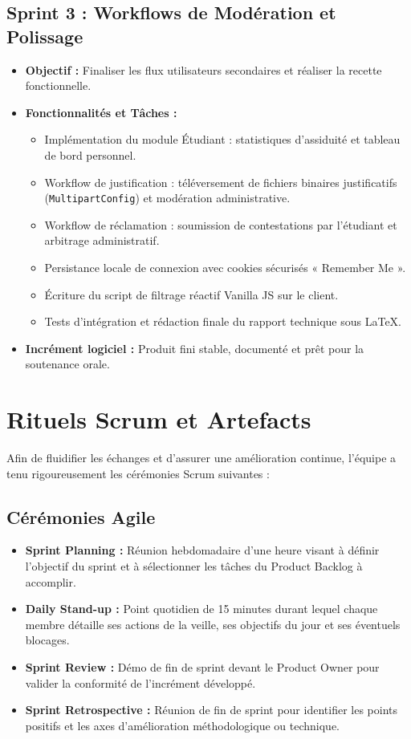 \documentclass[12pt,a4paper]{article}
\begin{document}
\subsection{Sprint 3 : Workflows de Modération et Polissage}
\begin{itemize}
    \item \textbf{Objectif :} Finaliser les flux utilisateurs secondaires et réaliser la recette fonctionnelle.
    \item \textbf{Fonctionnalités et Tâches :}
    \begin{itemize}
        \item Implémentation du module Étudiant : statistiques d'assiduité et tableau de bord personnel.
        \item Workflow de justification : téléversement de fichiers binaires justificatifs (\texttt{MultipartConfig}) et modération administrative.
        \item Workflow de réclamation : soumission de contestations par l'étudiant et arbitrage administratif.
        \item Persistance locale de connexion avec cookies sécurisés « Remember Me ».
        \item Écriture du script de filtrage réactif Vanilla JS sur le client.
        \item Tests d'intégration et rédaction finale du rapport technique sous LaTeX.
    \end{itemize}
    \item \textbf{Incrément logiciel :} Produit fini stable, documenté et prêt pour la soutenance orale.
\end{itemize}

\newpage
\section{Rituels Scrum et Artefacts}
Afin de fluidifier les échanges et d'assurer une amélioration continue, l'équipe a tenu rigoureusement les cérémonies Scrum suivantes :

\subsection{Cérémonies Agile}
\begin{itemize}
    \item \textbf{Sprint Planning :} Réunion hebdomadaire d'une heure visant à définir l'objectif du sprint et à sélectionner les tâches du Product Backlog à accomplir.
    \item \textbf{Daily Stand-up :} Point quotidien de 15 minutes durant lequel chaque membre détaille ses actions de la veille, ses objectifs du jour et ses éventuels blocages.
    \item \textbf{Sprint Review :} Démo de fin de sprint devant le Product Owner pour valider la conformité de l'incrément développé.
    \item \textbf{Sprint Retrospective :} Réunion de fin de sprint pour identifier les points positifs et les axes d'amélioration méthodologique ou technique.
\end{itemize}
\end{document}
